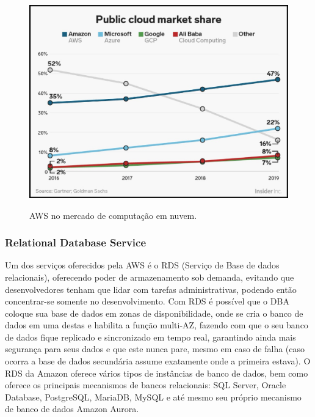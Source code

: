 \begin{figure}[H]
    \centering
        \caption{AWS no mercado de computação em nuvem.}
        \includegraphics[scale=0.3]{Imagens/awsNomercadoCloud.jpg}
        \label{fig:awsnuvem}
\end{figure}

\subsubsection{Relational Database Service}
Um dos serviços oferecidos pela AWS é o RDS (Serviço de Base de dados relacionais), oferecendo poder de armazenamento sob demanda, evitando que desenvolvedores tenham que lidar com tarefas administrativas, podendo então concentrar-se somente no desenvolvimento. 
Com RDS é possível que o DBA coloque sua base de dados em zonas de disponibilidade, onde se cria o banco de dados em uma destas e habilita a função multi-AZ, fazendo com que o seu banco de dados fique replicado e sincronizado em tempo real, garantindo ainda mais segurança para seus dados e que este nunca pare, mesmo em caso de falha (caso ocorra a base de dados secundária assume exatamente onde a primeira estava).
O RDS da Amazon oferece vários tipos de instâncias de banco de dados, bem como oferece os principais mecanismos de bancos relacionais: SQL Server, Oracle Database, PostgreSQL, MariaDB, MySQL e até mesmo seu próprio mecanismo de banco de dados Amazon Aurora.
\cite{reladataservice}

